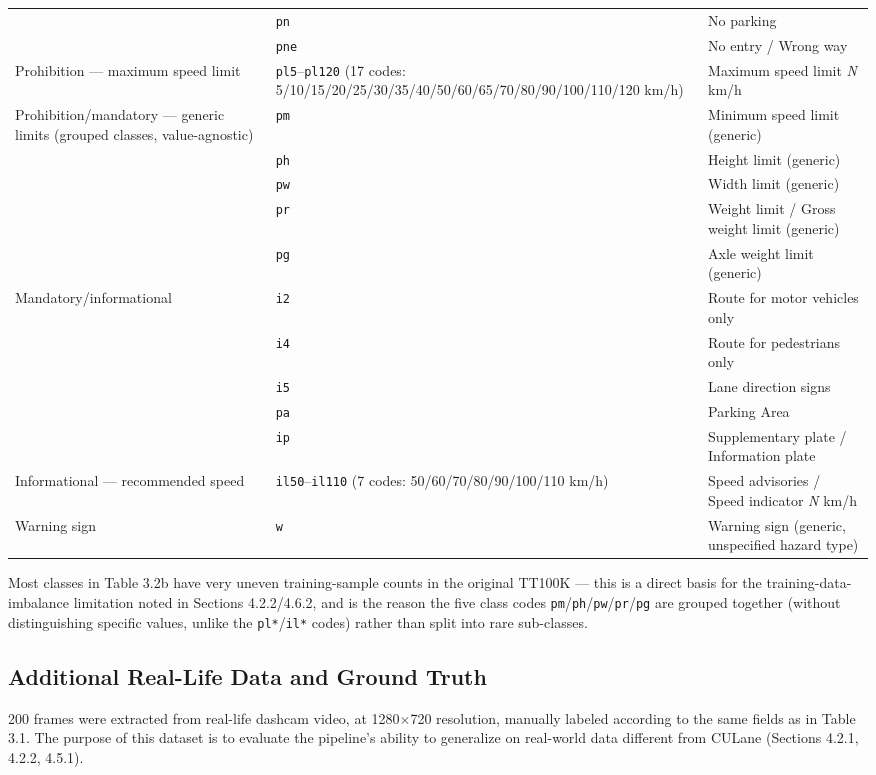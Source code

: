 \documentclass[12pt,a4paper]{report}
\begin{document}
\begin{longtable}{@{}p{4.2cm}p{2.4cm}p{6.5cm}@{}}
     & \texttt{pn} & No parking \\
     & \texttt{pne} & No entry / Wrong way \\
    Prohibition --- maximum speed limit & \texttt{pl5}--\texttt{pl120} (17 codes: 5/10/15/20/25/30/35/40/50/60/65/70/80/90/100/110/120 km/h) & Maximum speed limit \textit{N} km/h \\
    Prohibition/mandatory --- generic limits (grouped classes, value-agnostic) & \texttt{pm} & Minimum speed limit (generic) \\
     & \texttt{ph} & Height limit (generic) \\
     & \texttt{pw} & Width limit (generic) \\
     & \texttt{pr} & Weight limit / Gross weight limit (generic) \\
     & \texttt{pg} & Axle weight limit (generic) \\
    Mandatory/informational & \texttt{i2} & Route for motor vehicles only \\
     & \texttt{i4} & Route for pedestrians only \\
     & \texttt{i5} & Lane direction signs \\
     & \texttt{pa} & Parking Area \\
     & \texttt{ip} & Supplementary plate / Information plate \\
    Informational --- recommended speed & \texttt{il50}--\texttt{il110} (7 codes: 50/60/70/80/90/100/110 km/h) & Speed advisories / Speed indicator \textit{N} km/h \\
    Warning sign & \texttt{w} & Warning sign (generic, unspecified hazard type) \\
    \bottomrule
\end{longtable}

Most classes in Table 3.2b have very uneven training-sample counts in the original TT100K --- this is a direct basis for the training-data-imbalance limitation noted in Sections 4.2.2/4.6.2, and is the reason the five class codes \texttt{pm}/\texttt{ph}/\texttt{pw}/\texttt{pr}/\texttt{pg} are grouped together (without distinguishing specific values, unlike the \texttt{pl*}/\texttt{il*} codes) rather than split into rare sub-classes.

\subsection{Additional Real-Life Data and Ground Truth}

200 frames were extracted from real-life dashcam video, at 1280$\times$720 resolution, manually labeled according to the same fields as in Table 3.1. The purpose of this dataset is to evaluate the pipeline's ability to generalize on real-world data different from CULane (Sections 4.2.1, 4.2.2, 4.5.1).
\end{document}

